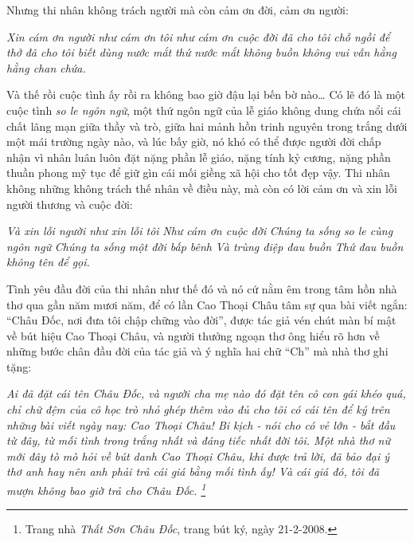 \documentclass[../main.tex]{subfiles}
\begin{document}
\begin{multicols}{2}
Nhưng thi nhân không trách người mà còn cảm ơn đời, cảm ơn người: 
\begin{blockquote}
        
\textit{Xin cám ơn người như cám ơn tôi}        
\textit{như cám ơn cuộc đời}        
\textit{đã cho tôi chỗ ngồi để thở}        
\textit{đã cho tôi biết dùng nước mắt}        
\textit{thứ nước mắt không buồn không vui} 
\textit{vẫn hằng hằng chan chứa.} 

\end{blockquote}
 
Và thế rồi cuộc tình ấy rồi ra không bao giờ đậu lại bến bờ nào… Có lẽ đó là một cuộc tình \textit{so le ngôn ngữ}, một thứ ngôn ngữ của lễ giáo không dung chứa nổi cái chất lãng mạn giữa thầy và trò, giữa hai mảnh hồn trinh nguyên trong trắng dưới một mái trường ngày nào, và lúc bấy giờ, nó khó có thể được người đời chấp nhận vì nhân luân luôn đặt nặng phần lễ giáo, nặng tính kỷ cương, nặng phần thuần phong mỹ tục để giữ gìn cái mối giềng xã hội cho tốt đẹp vậy. Thi nhân không những không trách thế nhân về điều này, mà còn có lời cảm ơn và xin lỗi người thương và cuộc đời: 
\begin{blockquote}
        
\textit{Và xin lỗi người như xin lỗi tôi}        
\textit{Như cám ơn cuộc đời}        
\textit{Chúng ta sống so le cùng ngôn ngữ}        
\textit{Chúng ta sống một đời bấp bênh}        
\textit{Và trùng điệp đau buồn} 
\textit{Thứ đau buồn không tên để gọi.} 

\end{blockquote}
 
Tình yêu đầu đời của thi nhân như thế đó và nó cứ nằm êm trong tâm hồn nhà thơ qua gần năm mươi năm, để có lần Cao Thoại Châu tâm sự qua bài viết ngắn: “Châu Đốc, nơi đưa tôi chập chững vào đời”, được tác giả vén chút màn bí mật về bút hiệu Cao Thoại Châu, và người thưởng ngoạn thơ ông hiểu rõ hơn về những bước chân đầu đời của tác giả và ý nghĩa hai chữ “Ch” mà nhà thơ ghi tặng: 
\begin{blockquote}
 
\textit{Ai đã đặt cái tên Châu Đốc, và người cha mẹ nào đó đặt tên cô con gái khéo quá, chỉ chữ đệm của cô học trò nhỏ ghép thêm vào đủ cho tôi có cái tên để ký trên những bài viết ngày nay: Cao Thoại Châu! Bi kịch - nói cho có vẻ lớn - bắt đầu từ đây, từ mối tình trong trắng nhất và đáng tiếc nhất đời tôi. Một nhà thơ nữ mới đây tò mò hỏi về bút danh Cao Thoại Châu, khi được trả lời, đã bảo đại ý thơ anh hay nên anh phải trả cái giá bằng mối tình ấy! Và cái giá đó, tôi đã mượn không bao giờ trả cho Châu Đốc. \footnote{
Trang nhà \textit{Thất Sơn Châu Đốc}, trang bút ký, ngày 21-2-2008.} } 


\end{blockquote}
\end{multicols}
\end{document}

